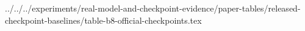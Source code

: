 ../../../experiments/real-model-and-checkpoint-evidence/paper-tables/released-checkpoint-baselines/table-b8-official-checkpoints.tex